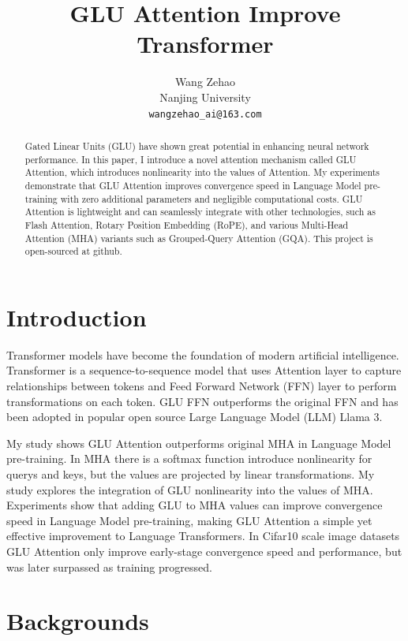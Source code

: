 \documentclass[11pt]{article}
\title{GLU Attention Improve Transformer}
\author{
Wang Zehao \\
Nanjing University \\
\texttt{wangzehao\_ai@163.com}
}
\begin{document}
\maketitle

\begin{abstract}

Gated Linear Units (GLU) have shown great potential in enhancing neural network performance. In this paper, I introduce a novel attention mechanism called GLU Attention, which introduces nonlinearity into the values of Attention. My experiments demonstrate that GLU Attention improves convergence speed in Language Model pre-training with zero additional parameters and negligible computational costs. GLU Attention is lightweight and can seamlessly integrate with other technologies, such as Flash Attention, Rotary Position Embedding (RoPE), and various Multi-Head Attention (MHA) variants such as Grouped-Query Attention (GQA). This project is open-sourced at github\cite{wangzehao2025gluattentiongithub}.
\end{abstract}


\section{Introduction}

Transformer\cite{vaswani2023attentionneed} models have become the foundation of modern artificial intelligence. Transformer is a sequence-to-sequence model that uses Attention layer to capture relationships between tokens and Feed Forward Network (FFN) layer to perform transformations on each token. GLU FFN\cite{shazeer2020gluvariantsimprovetransformer} outperforms the original FFN and has been adopted in popular open source Large Language Model (LLM) Llama 3\cite{grattafiori2024llama3herdmodels}.

My study shows GLU Attention outperforms original MHA in Language Model pre-training. In MHA there is a softmax function introduce nonlinearity for querys and keys, but the values are projected by linear transformations. My study explores the integration of GLU nonlinearity into the values of MHA. Experiments show that adding GLU to MHA values can improve convergence speed in Language Model pre-training, making GLU Attention a simple yet effective improvement to Language Transformers. In Cifar10 scale image datasets GLU Attention only improve early-stage convergence speed and performance, but was later surpassed as training progressed.

\section{Backgrounds}
\end{document}
